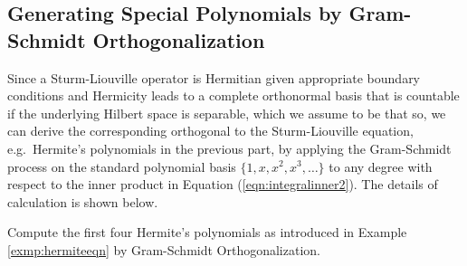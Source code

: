 \subsection{Generating Special Polynomials by Gram-Schmidt Orthogonalization}

Since a Sturm-Liouville operator is Hermitian given appropriate boundary conditions and Hermicity leads to a complete orthonormal basis that is countable if the underlying Hilbert space is separable, which we assume to be that so, we can derive the corresponding orthogonal  to the Sturm-Liouville equation, e.g.\ Hermite's polynomials in the previous part, by applying the Gram-Schmidt process on the standard polynomial basis $\{1, x, x^2, x^3, \ldots\}$ to any degree with respect to the inner product in Equation (\ref{eqn:integralinner2}). The details of calculation is shown below.
\begin{exmp}
Compute the first four Hermite's polynomials as introduced in Example \ref{exmp:hermiteeqn} by Gram-Schmidt Orthogonalization.
\end{exmp}
